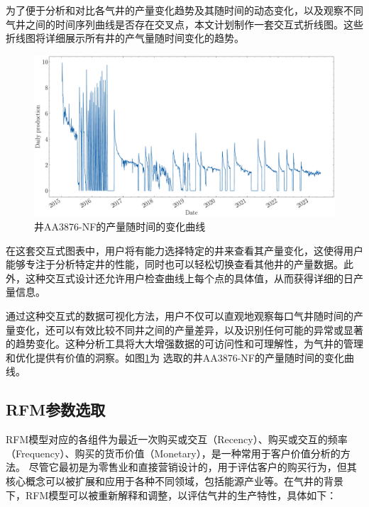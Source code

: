 为了便于分析和对比各气井的产量变化趋势及其随时间的动态变化，以及观察不同气井之间的时间序列曲线是否存在交叉点，本文计划制作一套交互式折线图。这些折线图将详细展示所有井的产气量随时间变化的趋势。
\begin{figure}[H]
    \centering
    \includegraphics[width=.9\linewidth]{figure/DailyProduction_SN0004-04.pdf}
    \caption{井AA3876-NF的产量随时间的变化曲线}
    \label{fig:dailychange}
\end{figure}

在这套交互式图表中，用户将有能力选择特定的井来查看其产量变化，这使得用户能够专注于分析特定井的性能，同时也可以轻松切换查看其他井的产量数据。此外，这种交互式设计还允许用户检查曲线上每个点的具体值，从而获得详细的日产量信息。

通过这种交互式的数据可视化方法，用户不仅可以直观地观察每口气井随时间的产量变化，还可以有效比较不同井之间的产量差异，以及识别任何可能的异常或显著的趋势变化。这种分析工具将大大增强数据的可访问性和可理解性，为气井的管理和优化提供有价值的洞察。如图\ref{fig:dailychange}为
选取的井AA3876-NF的产量随时间的变化曲线。

\subsection{RFM参数选取}
RFM模型对应的各组件为最近一次购买或交互（Recency）、购买或交互的频率（Frequency）、购买的货币价值（Monetary），是一种常用于客户价值分析的方法。
尽管它最初是为零售业和直接营销设计的，用于评估客户的购买行为，但其核心概念可以被扩展和应用于各种不同领域，包括能源产业等。在气井的背景
下，RFM模型可以被重新解释和调整，以评估气井的生产特性，具体如下：

